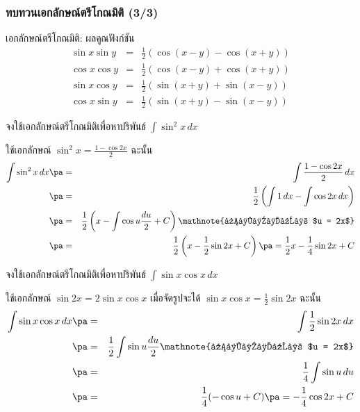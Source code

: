 \begin{frame}
\frametitle{ทบทวนเอกลักษณ์ตรีโกณมิติ (3/3)}
\begin{prop}{เอกลักษณ์ตรีโกณมิติ: ผลคูณฟังก์ชัน}{}
\begin{eqnarray*}
\sin x \sin y &=& \frac{1}{2} \left( \cos (x-y) - \cos (x+y) \right) \\
\cos x \cos y &=& \frac{1}{2} \left( \cos (x-y) + \cos (x+y) \right) \\
\sin x \cos y &=& \frac{1}{2} \left( \sin (x+y) + \sin (x-y) \right) \\
\cos x \sin y &=& \frac{1}{2} \left( \sin (x+y) - \sin (x-y) \right) 
\end{eqnarray*}
\end{prop}
\end{frame}


\begin{frame}[t]
\begin{ex}
จงใช้เอกลักษณ์ตรีโกณมิติเพื่อหาปริพันธ์ $\int \sin^2 x\, dx$
\end{ex} \pa
\begin{sol}
ใช้เอกลักษณ์ $\sin^2 x = \frac{1-\cos 2x}{2}$ \pa ฉะนั้น
\begin{eqnarray*}
\int \sin^2 x \, dx \pa &=& \int \frac{1-\cos 2x}{2} \, dx \\
\pa &=& \frac{1}{2} \left( \int 1 \, dx - \int \cos 2x \, dx \right) \\
\pa &=& \frac{1}{2}\left(x - \int \cos u \frac{du}{2} + C\right)  \mathnote{แทนค่า $u = 2x$}\\
\pa &=& \frac{1}{2}\left(x - \frac{1}{2}\sin 2x + C\right) \pa = \frac{1}{2}x - \frac{1}{4}\sin 2x + C
\end{eqnarray*}
\end{sol}
\end{frame}


\begin{frame}[t]
\begin{ex}
จงใช้เอกลักษณ์ตรีโกณมิติเพื่อหาปริพันธ์ $ \int \sin x \cos x \, dx$
\end{ex} \pa
\begin{sol}
ใช้เอกลักษณ์ $\sin 2x = 2\sin x \cos x$ \pa เมื่อจัดรูปจะได้ $\sin x \cos x = \frac{1}{2} \sin 2x$ ฉะนั้น \pa
\begin{eqnarray*}
\int \sin x \cos x \, dx \pa &=& \int \frac{1}{2} \sin 2x \, dx \\
\pa &=& \frac{1}{2} \int \sin u \frac{du}{2} \mathnote{แทนค่า $u = 2x$} \\
\pa &=& \frac{1}{4} \int \sin u \, du \\
\pa &=& \frac{1}{4} (-\cos u + C) \pa = -\frac{1}{4}\cos 2x + C
\end{eqnarray*}
\end{sol}
\end{frame}


